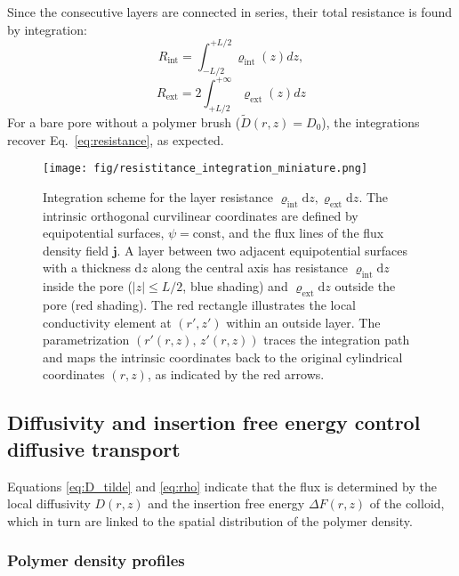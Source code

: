 \documentclass[12pt, a4paper]{article}
\begin{document}
Since the consecutive layers are connected in series, their total resistance is found by integration:
\begin{equation}
    R_{\text{int}} = \int_{-L/2}^{+L/2}\varrho_{\text{int}}(z) dz,
    \label{R_int}
\end{equation}
\begin{equation}
   R_{\text{ext}} =2\int_{+L/2}^{+\infty}\varrho_{\text{ext}}(z)dz
    \label{R_ext}
\end{equation}
For a bare pore without a polymer brush ($\tilde{D}(r,z)=D_0$), the integrations recover Eq.~\ref{eq:resistance}, as expected.

\begin{figure}
    \centering
    \texttt{[image: fig/resistitance\_integration\_miniature.png]}
    \caption{
    Integration scheme for the layer resistance $\varrho_{\text{int}}\text{d}z, \varrho_{\text{ext}}\text{d}z$.  
    The intrinsic orthogonal curvilinear coordinates are defined by equipotential surfaces, \mbox{$\psi = \text{const}$}, and the flux lines of the flux density field $\bm{j}$.
    A layer between two adjacent equipotential surfaces with a thickness $\text{d}z$ along the central axis has resistance $\varrho_{\text{int}}\text{d}z$ inside the pore ($|z| \leq L/2$, blue shading) and $\varrho_{\text{ext}}\text{d}z$ outside the pore (red shading).  
    The red rectangle illustrates the local conductivity element at $(r',z')$ within an outside layer.  
    The parametrization $(r'(r,z),\,z'(r,z))$ traces the integration path and maps the intrinsic coordinates back to the original cylindrical coordinates $(r,z)$, as indicated by the red arrows.
    }
    \label{fig:integration_scheme}
\end{figure}


\subsection{Diffusivity and insertion free energy control diffusive transport}

Equations \ref{eq:D_tilde} and \ref{eq:rho} indicate that the flux is determined by the local diffusivity $D(r,z)$ and the insertion free energy $\Delta F(r,z)$ of the colloid, which in turn are linked to the spatial distribution of the polymer density.


\subsubsection{Polymer density profiles}
\end{document}
